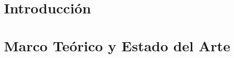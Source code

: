 \documentclass[12pt,twoside,titlepage]{report}
\newcommand\blankpage{%
    \newpage
    \null
    \thispagestyle{empty}%
    \newpage}
\begin{document}
\lstlistoflistings
{}









\pagestyle{fancy}


\renewcommand{\chaptermark}[1]{\markboth{Capítulo \thechapter.\ #1}{}}

\pagestyle{fancy}
\fancyhf{}
\fancyhead[LO]{\leftmark}
\fancyhead[RO]{}
\fancyhead[RE]{\nouppercase\rightmark}
\fancyhead[LE]{}
\fancyfoot[C]{\thepage}










\chapter{Introducción}
\label{sec:intro}



\pagestyle{fancy}


\setlength{\parskip}{0.75em}
\renewcommand{\baselinestretch}{1.25}
\setcounter{page}{1}





\chapter{Marco Teórico y Estado del Arte}
\label{sec:estadodelarte}
\end{document}
